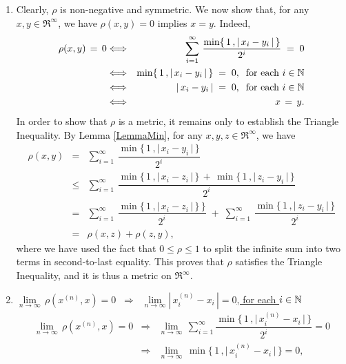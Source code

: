 \proof
\begin{enumerate}
\item
	Clearly, $\rho$ is non-negative and symmetric.
	We now show that, for any $x, y \in \Re^{\infty}$, we have $\rho(x,y) = 0$ implies $x=y$.
	Indeed,
	\begin{eqnarray*}
	\rho(x,y) \,=\, 0
	&\Longleftrightarrow& \sum_{i=1}^{\infty}\,\dfrac{\min\{\,1\,,\vert\,x_{i}-y_{i}\,\vert\,\}}{2^{i}} \;=\; 0
	\\
	&\Longleftrightarrow& \min\{\,1\,,\vert\,x_{i}-y_{i}\,\vert\,\} \;=\; 0,\;\;\textnormal{for each $i \in \mathbb{N}$}
	\\
	&\Longleftrightarrow& \vert\,x_{i}-y_{i}\,\vert \;=\; 0,\;\;\textnormal{for each $i \in \mathbb{N}$}
	\\
	&\Longleftrightarrow& x \,=\, y.
	\end{eqnarray*}
	In order to show that $\rho$ is a metric, it remains only to establish the Triangle Inequality.
	By Lemma \ref{LemmaMin}, for any $x, y, z \in \Re^{\infty}$, we have 
	\begin{eqnarray*}
	\rho(x,y)
	&=& \sum_{i=1}^{\infty}\,\dfrac{\min\{\,1\,,\vert\,x_{i}-y_{i}\,\vert\,\}}{2^{i}}
	\\
	&\leq& \sum_{i=1}^{\infty}\,\dfrac{\min\{\,1\,,\vert\,x_{i}-z_{i}\,\vert\,\} \,+\,\min\{\,1\,,\vert\,z_{i}-y_{i}\,\vert\,\}}{2^{i}}
	\\
	&=&
	\sum_{i=1}^{\infty}\,\dfrac{\min\{\,1\,,\vert\,x_{i}-z_{i}\,\vert\,\}\,\}}{2^{i}}
	\;+\;
	\sum_{i=1}^{\infty}\,\dfrac{\min\{\,1\,,\vert\,z_{i}-y_{i}\,\vert\,\}}{2^{i}}
	\\
	&=& \rho(x,z) + \rho(z,y),
	\end{eqnarray*}
	where we have used the fact that $0 \leq \rho \leq 1$ to split the infinite sum into two terms in
	second-to-last equality. This proves that $\rho$ satisfies the Triangle Inequality, and it is thus a metric
	on $\Re^{\infty}$.
\item
	\underline{$\underset{n\rightarrow\infty}{\lim}\,\rho\!\left(x^{(n)},x\right) = 0
	\;\;\Longrightarrow\;\;
	\underset{n\rightarrow\infty}{\lim}\left\vert\,x^{(n)}_{i} - x_{i}\,\right\vert = 0$, for each $i \in \mathbb{N}$\;\mbox{}}
	\begin{eqnarray*}
	\underset{n\rightarrow\infty}{\lim}\,\rho\!\left(x^{(n)},x\right) = 0
	&\Longrightarrow&
		\underset{n\rightarrow\infty}{\lim}\,\sum^{\infty}_{i=1}\dfrac{\min\{\,1\,,\vert\,x^{(n)}_{i} - x_{i}\,\vert\,\}}{2^{i}} = 0
	\\
	&\Longrightarrow& \underset{n\rightarrow\infty}{\lim}\,\min\{\,1\,,\vert\,x^{(n)}_{i} - x_{i}\,\vert\,\} = 0,

\end{eqnarray*}
\end{enumerate}

